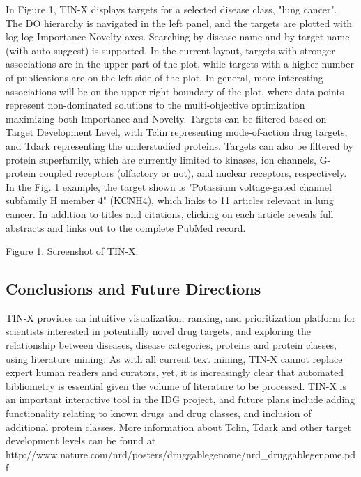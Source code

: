 In Figure 1, TIN-X displays targets for a selected disease class, "lung cancer".  The DO hierarchy is navigated in the left panel, and the targets are plotted with log-log Importance-Novelty axes. Searching by disease name and by target name (with auto-suggest) is supported. In the current layout, targets with stronger associations are in the upper part of the plot, while targets with a higher number of publications are on the left side of the plot. In general, more interesting associations will be on the upper right boundary of the plot, where data points represent non-dominated solutions to the multi-objective optimization maximizing both Importance and Novelty.  Targets can be filtered based on Target Development Level, with Tclin representing mode-of-action drug targets\cite{Santos2017-sd}, and Tdark representing the understudied proteins\cite{Nguyen2017-lo}. Targets can also be filtered by protein superfamily, which are currently limited to kinases, ion channels, G-protein coupled receptors (olfactory or not), and nuclear receptors, respectively. In the Fig. 1 example, the target shown is "Potassium voltage-gated channel subfamily H member 4" (KCNH4), which links to 11 articles relevant in lung cancer.  In addition to titles and citations, clicking on each article reveals full abstracts and links out to the complete PubMed record. 

Figure 1. Screenshot of TIN-X.

\subsection{Conclusions and Future Directions}

TIN-X provides an intuitive visualization, ranking, and prioritization platform for scientists interested in potentially novel drug targets, and exploring the relationship between diseases, disease categories, proteins and protein classes, using literature mining.  As with all current text mining, TIN-X cannot replace expert human readers and curators, yet, it is increasingly clear that automated bibliometry is essential given the volume of literature to be processed.  TIN-X is an important interactive tool in the IDG project, and future plans include adding functionality relating to known drugs and drug classes, and inclusion of additional protein classes. More information about Tclin, Tdark and other target development levels can be found at http://www.nature.com/nrd/posters/druggablegenome/nrd\_druggablegenome.pdf
